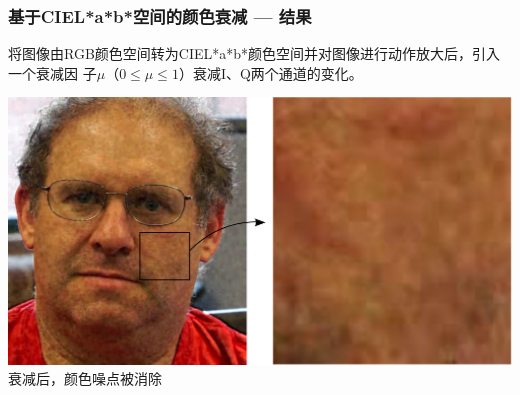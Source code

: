 \documentclass[xcolor=svgnames,serif,table,10pt]{beamer}
\begin{document}
\begin{frame}
  \frametitle{基于CIEL*a*b*空间的颜色衰减 --- 结果}
  \small
  将图像由RGB颜色空间转为CIEL*a*b*颜色空间并对图像进行动作放大后，引入一个衰减因
  子\alert{$\mu$}（$0\le \mu \le 1$）衰减I、Q两个通道的变化。

  \begin{center}
    \includegraphics[width=.8\textwidth]{attenuation-after.png}\\
    衰减后，颜色噪点被消除
  \end{center}
\end{frame}
\end{document}
